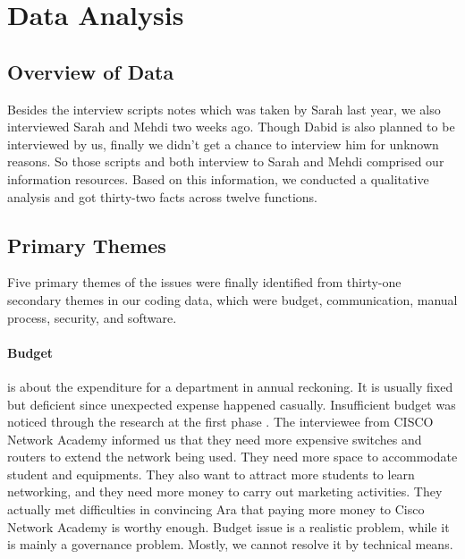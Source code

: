 
\section{Data Analysis}

\subsection{Overview of Data}
Besides the interview scripts notes which was taken by Sarah last year, we also interviewed Sarah and Mehdi two weeks ago. Though Dabid is also planned to be interviewed by us, finally we didn't get a chance to interview him for unknown reasons. So those scripts and both interview to Sarah and Mehdi comprised our information resources. Based on this information, we conducted a qualitative analysis and got thirty-two facts across twelve functions.

\subsection{Primary Themes}
Five primary themes of the issues were finally identified from thirty-one secondary themes in our coding data, which were budget, communication, manual process, security, and software. 

\paragraph{Budget} is about the expenditure for a department in annual reckoning. It is usually fixed but deficient since unexpected expense happened casually. Insufficient budget was noticed through the research at the first phase . The interviewee from CISCO Network Academy informed us that they need more expensive switches and routers to extend the network being used. They need more space to accommodate student and equipments. They also want to attract more students to learn networking, and they need more money to carry out marketing activities. They actually met difficulties in convincing Ara that paying more money to Cisco Network Academy is worthy enough. Budget issue is a realistic problem, while it is mainly a governance problem. Mostly, we cannot resolve it by technical means.

